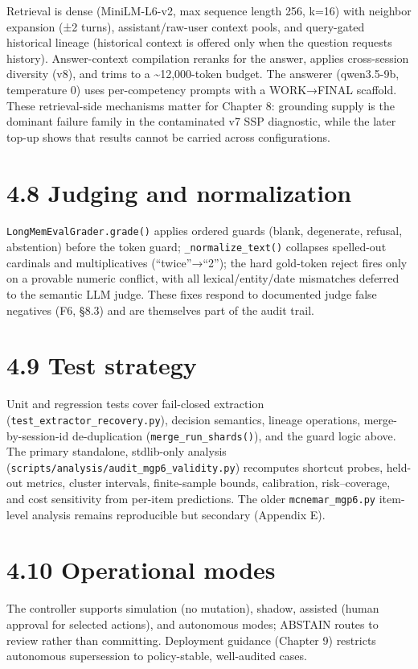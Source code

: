 Retrieval is dense (MiniLM-L6-v2, max sequence length 256, k=16) with
neighbor expansion (±2 turns), assistant/raw-user context pools, and
query-gated historical lineage (historical context is offered only when
the question requests history). Answer-context compilation reranks for
the answer, applies cross-session diversity (v8), and trims to a
\textasciitilde12,000-token budget. The answerer (qwen3.5-9b,
temperature 0) uses per-competency prompts with a WORK→FINAL scaffold.
These retrieval-side mechanisms matter for Chapter 8: grounding supply
is the dominant failure family in the contaminated v7 SSP diagnostic,
while the later top-up shows that results cannot be carried across
configurations.

\section{4.8 Judging and normalization}\label{judging-and-normalization}

\texttt{LongMemEvalGrader.grade()} applies ordered guards (blank,
degenerate, refusal, abstention) before the token guard;
\texttt{\_normalize\_text()} collapses spelled-out cardinals and
multiplicatives (``twice''→``2''); the hard gold-token reject fires only
on a provable numeric conflict, with all lexical/entity/date mismatches
deferred to the semantic LLM judge. These fixes respond to documented
judge false negatives (F6, §8.3) and are themselves part of the audit
trail.

\section{4.9 Test strategy}\label{test-strategy}

Unit and regression tests cover fail-closed extraction
(\texttt{test\_extractor\_recovery.py}), decision semantics, lineage
operations, merge-by-session-id de-duplication
(\texttt{merge\_run\_shards()}), and the guard logic above. The primary
standalone, stdlib-only analysis
(\texttt{scripts/analysis/audit\_mgp6\_validity.py}) recomputes shortcut
probes, held-out metrics, cluster intervals, finite-sample bounds,
calibration, risk--coverage, and cost sensitivity from per-item
predictions. The older \texttt{mcnemar\_mgp6.py} item-level analysis
remains reproducible but secondary (Appendix E).

\section{4.10 Operational modes}\label{operational-modes}

The controller supports simulation (no mutation), shadow, assisted
(human approval for selected actions), and autonomous modes; ABSTAIN
routes to review rather than committing. Deployment guidance (Chapter 9)
restricts autonomous supersession to policy-stable, well-audited cases.
